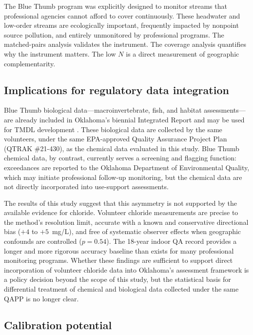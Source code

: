 \documentclass[lineno]{wlpeerj}
\begin{document}
The Blue Thumb program was explicitly designed to monitor streams that professional agencies cannot afford to cover continuously. These headwater and low-order streams are ecologically important, frequently impacted by nonpoint source pollution, and entirely unmonitored by professional programs. The matched-pairs analysis validates the instrument. The coverage analysis quantifies why the instrument matters. The low $N$ is a direct measurement of geographic complementarity.

\subsection{Implications for regulatory data integration}

Blue Thumb biological data---macroinvertebrate, fish, and habitat assessments---are already included in Oklahoma's biennial Integrated Report and may be used for TMDL development \citep{OCC2019}. These biological data are collected by the same volunteers, under the same EPA-approved Quality Assurance Project Plan (QTRAK \#21-430), as the chemical data evaluated in this study. Blue Thumb chemical data, by contrast, currently serves a screening and flagging function: exceedances are reported to the Oklahoma Department of Environmental Quality, which may initiate professional follow-up monitoring, but the chemical data are not directly incorporated into use-support assessments.

The results of this study suggest that this asymmetry is not supported by the available evidence for chloride. Volunteer chloride measurements are precise to the method's resolution limit, accurate with a known and conservative directional bias ($+4$ to $+5$~mg/L), and free of systematic observer effects when geographic confounds are controlled ($p = 0.54$). The 18-year indoor QA record provides a longer and more rigorous accuracy baseline than exists for many professional monitoring programs. Whether these findings are sufficient to support direct incorporation of volunteer chloride data into Oklahoma's assessment framework is a policy decision beyond the scope of this study, but the statistical basis for differential treatment of chemical and biological data collected under the same QAPP is no longer clear.

\subsection{Calibration potential}
\end{document}
